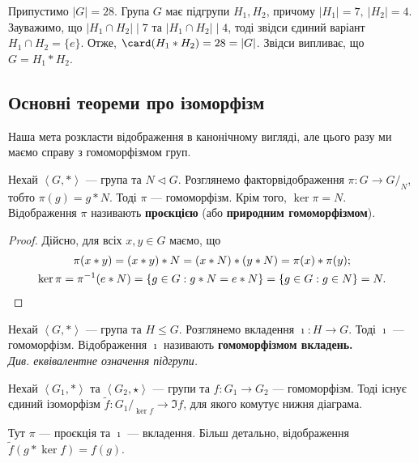 \documentclass{math_library}
\begin{document}
\begin{example}
Припустимо $|G| = 28$. Група $G$ має підгрупи $H_1,H_2$, причому $|H_1| = 7,\ |H_2| = 4$. Зауважимо, що $|H_1 \cap H_2| \mid 7$ та $|H_1 \cap H_2| \mid 4$, тоді звідси єдиний варіант $H_1 \cap H_2 = \{e\}$. Отже, $\card(H_1*H_2) = 28 = |G|$. Звідси випливає, що $G = H_1*H_2$.
\end{example}

\subsection{Основні теореми про ізоморфізм}
Наша мета розкласти відображення в канонічному вигляді, але цього разу ми маємо справу з гомоморфізмом груп.
\begin{lemma}
Нехай $\left< G, *\right>$ --- група та $N \triangleleft G$. Розглянемо факторвідображення $\pi \colon G \to G/_{N}$, тобто $\pi(g) = g*N$. Тоді $\pi$ --- гомоморфізм. Крім того, $\ker \pi = N$. Відображення $\pi$ називають \textbf{проєкцією} (або \textbf{природним гомоморфізмом}).
\end{lemma}

\begin{proof}
Дійсно, для всіх $x,y \in G$ маємо, що
\begin{gather*}
\pi(x*y) = (x*y)*N = (x*N)*(y*N) = \pi(x) * \pi(y); \\
\ker \pi = \pi^{-1}(e*N) = \{g \in G: g*N = e*N\} = \{g \in G: g \in N\} = N. \qedhere
\end{gather*}
\end{proof}

\begin{lemma}
Нехай $\left<G, *\right>$ --- група та $H \leq G$. Розглянемо вкладення $\imath \colon H \to G$. Тоді $\imath$ --- гомоморфізм. Відображення $\imath$ називають \textbf{гомоморфізмом вкладень.}\\
\textit{Див. еквівалентне означення підгрупи.}
\end{lemma}

\begin{theorem}
Нехай $\left<G_1, * \right>$ та $\left<G_2, \star \right>$ --- групи та $f \colon G_1 \to G_2$ --- гомоморфізм. Тоді існує єдиний ізоморфізм $\tilde{f} \colon G_1/_{\ker f} \to \Im f$, для якого комутує нижня діаграма.
\begin{figure}[H]
\centering
{}
\end{figure}
Тут $\pi$ --- проєкція та $\imath$ --- вкладення. Більш детально, відображення $\tilde{f}(g*\ker f) = f(g)$.
\end{theorem}
\end{document}
